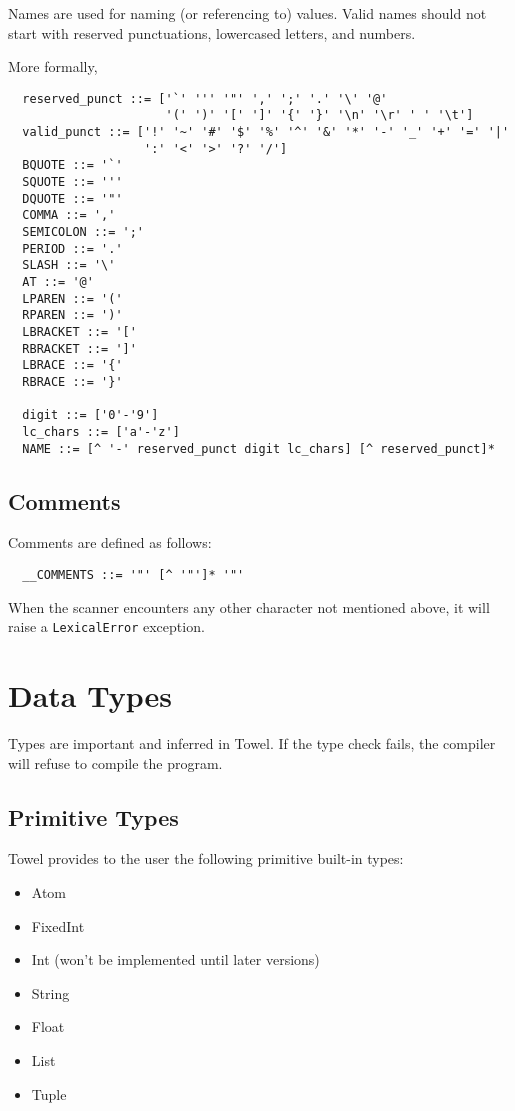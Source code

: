 \documentclass{book}
\begin{document}
Names are used for naming (or referencing to) values. Valid names should not start with reserved punctuations, lowercased letters, and numbers.

More formally,
\begin{verbatim}
  reserved_punct ::= ['`' ''' '"' ',' ';' '.' '\' '@' 
                      '(' ')' '[' ']' '{' '}' '\n' '\r' ' ' '\t']
  valid_punct ::= ['!' '~' '#' '$' '%' '^' '&' '*' '-' '_' '+' '=' '|'
                   ':' '<' '>' '?' '/']
  BQUOTE ::= '`'
  SQUOTE ::= '''
  DQUOTE ::= '"'
  COMMA ::= ','
  SEMICOLON ::= ';'
  PERIOD ::= '.'
  SLASH ::= '\'
  AT ::= '@'
  LPAREN ::= '('
  RPAREN ::= ')'
  LBRACKET ::= '['
  RBRACKET ::= ']'
  LBRACE ::= '{'
  RBRACE ::= '}'

  digit ::= ['0'-'9']
  lc_chars ::= ['a'-'z']
  NAME ::= [^ '-' reserved_punct digit lc_chars] [^ reserved_punct]*
\end{verbatim}

\section{Comments}

Comments are defined as follows:
\begin{verbatim}
  __COMMENTS ::= '"' [^ '"']* '"'
\end{verbatim}

When the scanner encounters any other character not mentioned above, it will raise a \texttt{LexicalError} exception.

\chapter{Data Types}
\label{chap:data-types}

Types are important and inferred in Towel. If the type check fails, the compiler will refuse to compile the program.

\section{Primitive Types}
Towel provides to the user the following primitive built-in types:
\begin{itemize}
\item Atom
\item FixedInt
\item Int (won't be implemented until later versions)
\item String
\item Float
\item List
\item Tuple
\end{itemize}
\end{document}
